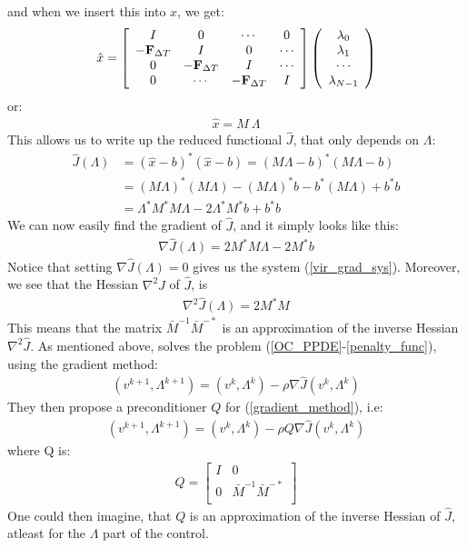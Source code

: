 \documentclass[11pt,a4paper]{article}
\begin{document}
and when we insert this into $x$, we get:
\begin{align}
\hat{x} = \left[ \begin{array}{cccc}
   I & 0 & \cdots & 0 \\  
   -\bold{F}_{\Delta T} & I & 0 & \cdots \\ 
   0 &-\bold{F}_{\Delta T} & I  & \cdots \\
   0 &\cdots &-\bold{F}_{\Delta T} & I   \\
   \end{array}  \right]
   \left( \begin{array}{c}
   \lambda_0 \\  
   \lambda_1 \\ 
   \cdots  \\
   \lambda_{N-1}  \\
   \end{array}  \right)
\end{align}
or:
\begin{align}
\hat{x} = M \ \Lambda
\end{align}
This allows us to write up the reduced functional $\hat{J}$, that only depends on $\Lambda$:
\begin{align*}
\hat{J}(\Lambda)&= (\hat{x}-b)^*(\hat{x}-b) =
(M  \Lambda -b)^*(M  \Lambda -b) \\
&= (M  \Lambda)^*(M  \Lambda) - (M  \Lambda)^*b-b^*(M  \Lambda) + b^*b \\
&=\Lambda^*M^*M  \Lambda - 2\Lambda^*M^*b + b^*b
\end{align*}
We can now easily find the gradient of $\hat{J}$, and it simply looks like this:
\begin{align*}
\nabla\hat{J}(\Lambda) = 2 M^*M\Lambda - 2M^*b
\end{align*}
Notice that setting $\nabla\hat{J}(\Lambda)=0$ gives us the system (\ref{vir_grad_sys}). Moreover, we see that the Hessian $\nabla^2 \hat{J}$ of $\hat{J}$, is
\begin{align}
\nabla^2 \hat{J}(\Lambda) = 2 M^*M
\end{align}
This means that the matrix $\bar{M}^{-1}\bar{M}^{-*}$ is an approximation of the inverse Hessian $\nabla^2 \hat{J}$. As mentioned above, \cite{maday2002parareal} solves the problem (\ref{OC_PPDE}-\ref{penalty_func}), using the gradient method:
\begin{align}
(v^{k+1},\Lambda^{k+1}) = (v^{k},\Lambda^{k}) -\rho\nabla\hat{J}(v^{k},\Lambda^{k}) \label{gradient_method}
\end{align}
They then propose a preconditioner $Q$ for (\ref{gradient_method}), i.e:
\begin{align}
(v^{k+1},\Lambda^{k+1}) = (v^{k},\Lambda^{k}) -\rho Q\nabla\hat{J}(v^{k},\Lambda^{k}) 
\end{align}
where Q is:
\begin{align}
Q = \left[ \begin{array}{cc}
	I & 0 \\
	0 & \bar{M}^{-1}\bar{M}^{-*} \\
	\end{array} \right]
\end{align}
One could then imagine, that $Q$ is an approximation of the inverse Hessian of $\hat{J}$, atleast for the $\Lambda$ part of the control.
\end{document}
